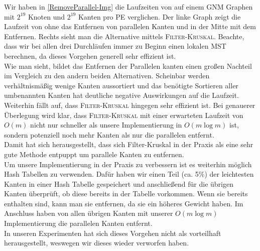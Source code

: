 Wir haben in \cref{RemoveParallel-Img} die Laufzeiten von \boruvkaAllreduce auf einem GNM Graphen mit $2^{19}$ Knoten und $2^{19}$ Kanten pro PE verglichen. Der linke Graph zeigt die Laufzeit von \boruvkaAllreduce ohne das Entfernen von parallelen Kanten und in der Mitte mit dem Entfernen. Rechts sieht man die Alternative mittels \textsc{Filter-Kruskal}. Beachte, dass wir bei allen drei Durchläufen immer zu Beginn einen lokalen MST berechnen, da dieses Vorgehen generell sehr effizient ist.\\
Wie man sieht, bildet das Entfernen der Parallelen kanten einen großen Nachteil im Vergleich zu den andern beiden Alternativen. Scheinbar werden verhältnismäßig wenige Kanten aussortiert und das benötigte Sortieren aller umbenannten Kanten hat deutliche negative Auswirkungen auf die Laufzeit.\\
Weiterhin fällt auf, dass \textsc{Filter-Kruskal} hingegen sehr effizient ist. Bei genauerer Überlegung wird klar, dass \textsc{Filter-Kruskal} mit einer erwarteten Laufzeit von $O(m)$ nicht nur schneller als unsere Implementierung in $O(m \log m)$ ist, sondern potenziell noch mehr Kanten als nur die parallelen entfernt. \\
Damit hat sich herausgestellt, dass sich Filter-Kruskal in der Praxis als eine sehr gute Methode entpuppt um parallele Kanten zu entfernen.\\
Um unsere Implementierung in der Praxis zu verbessern ist es weiterhin möglich Hash Tabellen zu verwenden. Dafür haben wir einen Teil (ca. 5\%) der leichtesten Kanten in einer Hash Tabelle gespeichert und anschließend für die übrigen Kanten überprüft, ob diese bereits in der Tabelle vorkommen. Wenn sie bereits enthalten sind, kann man sie entfernen, da sie ein höheres Gewicht haben. Im Anschluss haben von allen übrigen Kanten mit unserer $O(m \log m)$ Implementierung die parallelen Kanten entfernt. \\
In unseren Experimenten hat sich dieses Vorgehen nicht als vorteilhaft herausgestellt, weswegen wir dieses wieder verworfen haben.





